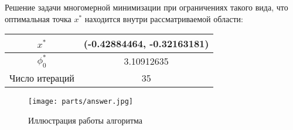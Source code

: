 \documentclass[../body.tex]{subfiles}
\begin{document}
Решение задачи многомерной минимизации при ограничениях такого вида, что оптимальная точка $x^*$ находится внутри рассматриваемой области:
\begin{table}[H]
    \centering
    \begin{tabular}{|c|c|}
        \hline
        $x^*$ & (-0.42884464, -0.32163181)\\\hline
        $\phi_0^*$ & 3.10912635\\\hline
        Число итераций & 35\\\hline
    \end{tabular}
\end{table}

\begin{figure}[H]
    \centering
    \texttt{[image: parts/answer.jpg]}
    \caption{Иллюстрация работы алгоритма}
\end{figure}
\end{document}
